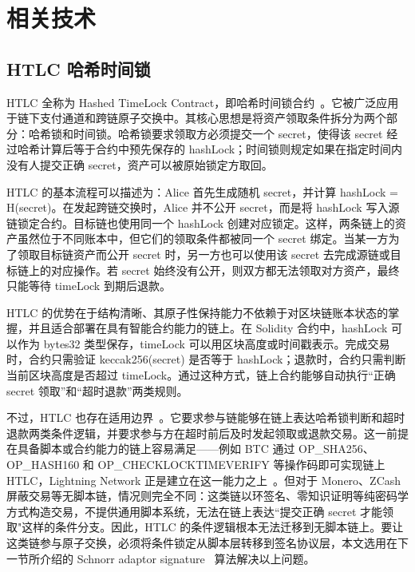 
\chapter{相关技术}


\section{HTLC 哈希时间锁}


HTLC 全称为 Hashed TimeLock Contract，即哈希时间锁合约~\cite{poon2016bitcoin,10.1145/3212734.3212736}。它被广泛应用于链下支付通道和跨链原子交换中。其核心思想是将资产领取条件拆分为两个部分：哈希锁和时间锁。哈希锁要求领取方必须提交一个 secret，使得该 secret 经过哈希计算后等于合约中预先保存的 hashLock；时间锁则规定如果在指定时间内没有人提交正确 secret，资产可以被原始锁定方取回。


HTLC 的基本流程可以描述为：Alice 首先生成随机 secret，并计算 hashLock = H(secret)。在发起跨链交换时，Alice 并不公开 secret，而是将 hashLock 写入源链锁定合约。目标链也使用同一个 hashLock 创建对应锁定。这样，两条链上的资产虽然位于不同账本中，但它们的领取条件都被同一个 secret 绑定。当某一方为了领取目标链资产而公开 secret 时，另一方也可以使用该 secret 去完成源链或目标链上的对应操作。若 secret 始终没有公开，则双方都无法领取对方资产，最终只能等待 timeLock 到期后退款。


HTLC 的优势在于结构清晰、其原子性保持能力不依赖于对区块链账本状态的掌握，并且适合部署在具有智能合约能力的链上。在 Solidity 合约中，hashLock 可以作为 bytes32 类型保存，timeLock 可以用区块高度或时间戳表示。完成交易时，合约只需验证 keccak256(secret) 是否等于 hashLock；退款时，合约只需判断当前区块高度是否超过 timeLock。通过这种方式，链上合约能够自动执行“正确 secret 领取”和“超时退款”两类规则。


不过，HTLC 也存在适用边界~\cite{tsabary2021mad}。它要求参与链能够在链上表达哈希锁判断和超时退款两类条件逻辑，并要求参与方在超时前后及时发起领取或退款交易。这一前提在具备脚本或合约能力的链上容易满足——例如 BTC 通过 OP\_SHA256、OP\_HASH160 和 OP\_CHECKLOCKTIMEVERIFY 等操作码即可实现链上 HTLC，Lightning Network 正是建立在这一能力之上~\cite{poon2016bitcoin}。但对于 Monero、ZCash 屏蔽交易等无脚本链，情况则完全不同：这类链以环签名、零知识证明等纯密码学方式构造交易，不提供通用脚本系统，无法在链上表达``提交正确 secret 才能领取"这样的条件分支。因此，HTLC 的条件逻辑根本无法迁移到无脚本链上。要让这类链参与原子交换，必须将条件锁定从脚本层转移到签名协议层，本文选用在下一节所介绍的 Schnorr adaptor signature~\cite{9833731} 算法解决以上问题。


